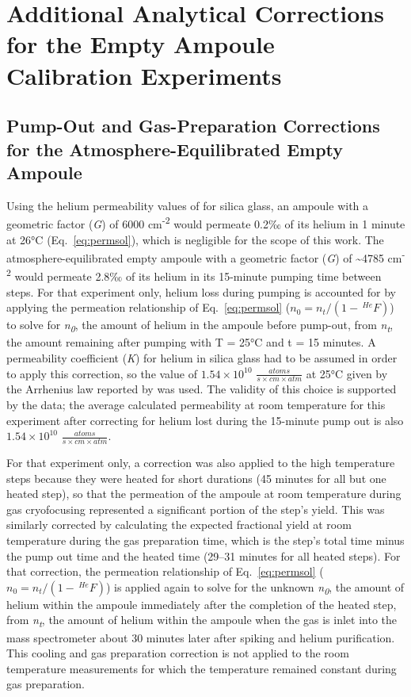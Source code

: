 \section{Additional Analytical Corrections for the Empty Ampoule Calibration Experiments}\label{additional-analytical-corrections}

\subsection{Pump-Out and Gas-Preparation Corrections for the Atmosphere-Equilibrated Empty Ampoule}\label{pump-out-and-gas-preparation-corrections}

Using the helium permeability values of \citet{swets1961} for silica glass, an ampoule with a geometric factor (\emph{G}) of 6000 cm\textsuperscript{-2} would permeate 0.2‰ of its helium in 1 minute at 26°C (Eq.~\eqref{eq:permsol}), which is negligible for the scope of this work. The atmosphere-equilibrated empty ampoule with a geometric factor (\emph{G}) of \textasciitilde4785 cm\textsuperscript{-2} would permeate 2.8‰ of its helium in its 15-minute pumping time between steps. For that experiment only, helium loss during pumping is accounted for by applying the permeation relationship of Eq.~\eqref{eq:permsol} (\(n_{0} = n_{t}/(1 - \,^{He}F)\)) to solve for \emph{n\textsubscript{0}}, the amount of helium in the ampoule before pump-out, from \emph{n\textsubscript{t}}, the amount remaining after pumping with T = 25°C and t = 15 minutes. A permeability coefficient (\emph{K}) for helium in silica glass had to be assumed in order to apply this correction, so the value of \(1.54 \times 10^{10}\) \(\frac{atoms}{s \times cm \times atm}\) at 25°C given by the Arrhenius law reported by \citet{swets1961} was used. The validity of this choice is supported by the data; the average calculated permeability at room temperature for this experiment after correcting for helium lost during the 15-minute pump out is also \(1.54 \times 10^{10}\) \(\frac{atoms}{s \times cm \times atm}\).

For that experiment only, a correction was also applied to the high temperature steps because they were heated for short durations (45 minutes for all but one heated step), so that the permeation of the ampoule at room temperature during gas cryofocusing represented a significant portion of the step's yield. This was similarly corrected by calculating the expected fractional yield at room temperature during the gas preparation time, which is the step's total time minus the pump out time and the heated time (29--31 minutes for all heated steps). For that correction, the permeation relationship of Eq.~\eqref{eq:permsol} (\(n_{0} = n_{t}/(1 - \,^{He}F)\)) is applied again to solve for the unknown \emph{n\textsubscript{0}}, the amount of helium within the ampoule immediately after the completion of the heated step, from \emph{n\textsubscript{t}}, the amount of helium within the ampoule when the gas is inlet into the mass spectrometer about 30 minutes later after spiking and helium purification. This cooling and gas preparation correction is not applied to the room temperature measurements for which the temperature remained constant during gas preparation.

